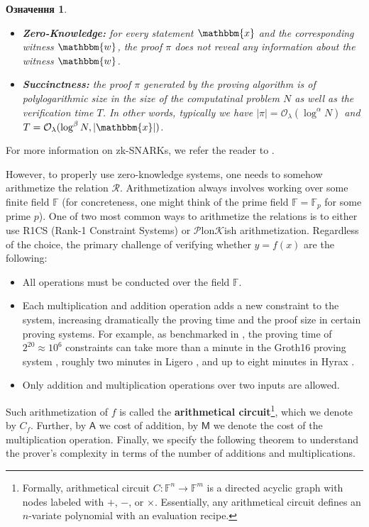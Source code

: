 \documentclass[12pt,a4paper,oneside]{book}
\theoremstyle{dplplain}
\theoremstyle{dpldefinition}
\newtheorem{definition}[theorem]{Означення}%
\theoremstyle{dplremark}
\begin{document}
\begin{definition}
\begin{itemize}
        \item \textbf{Zero-Knowledge:} for every statement $\mathbbm{x}$ and the
        corresponding witness $\mathbbm{w}$, the proof $\pi$ does not reveal any information about the witness
        $\mathbbm{w}$.
        \item \textbf{Succinctness:} the proof $\pi$ generated by the proving
        algorithm is of polylogarithmic size in the size of the computatinal
        problem $N$ as well as the verification time $T$. In other words,
        typically we have $|\pi| = \mathcal{O}_{\lambda}(\log^{\alpha} N)$ and
        $T=\mathcal{O}_{\lambda}(\log^{\beta} N,|\mathbbm{x}|)$.
    \end{itemize}
\end{definition}

For more information on zk-SNARKs, we refer the reader to \cite{zksnark}.

However, to properly use zero-knowledge systems, one needs to somehow
arithmetize the relation $\mathcal{R}$. Arithmetization always involves working
over some finite field $\mathbb{F}$ (for concreteness, one might think of the
prime field $\mathbb{F} = \mathbb{F}_p$ for some prime $p$). One of two most
common ways to arithmetize the relations is to either use R1CS (Rank-1
Constraint Systems) or $\mathcal{P}$lon$\mathcal{K}$ish arithmetization.
Regardless of the choice, the primary challenge of verifying whether $y=f(x)$
are the following:
\begin{itemize}
    \item All operations must be conducted over the field $\mathbb{F}$.
    \item Each multiplication and addition operation adds a new constraint to
    the system, increasing dramatically the proving time and the proof size in
    certain proving systems. For example, as benchmarked in \cite{spartan}, the
    proving time of $2^{20} \approx 10^6$ constraints can take more than a
    minute in the Groth16 proving system \cite{groth16}, roughly two minutes in
    Ligero \cite{ligero}, and up to eight minutes in Hyrax \cite{hyrax}.
    \item Only addition and multiplication operations over two inputs are
    allowed.
\end{itemize}

Such arithmetization of $f$ is called the \textbf{arithmetical
circuit}\footnote{Formally, arithmetical circuit $C: \mathbb{F}^n \to
\mathbb{F}^m$ is a directed acyclic graph with nodes labeled with $+$, $-$, or
$\times$. Essentially, any arithmetical circuit defines an $n$-variate
polynomial with an evaluation recipe.}, which we denote by $C_f$. Further, by
$\mathsf{A}$ we cost of addition, by $\mathsf{M}$ we denote the cost of the
multiplication operation. Finally, we specify the following theorem to
understand the prover's complexity in terms of the number of additions and
multiplications.
\end{document}
